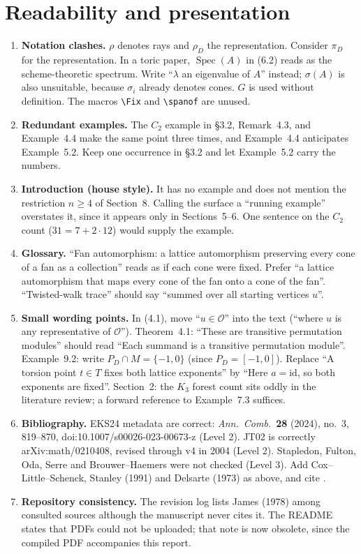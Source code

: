 \documentclass[12pt,letterpaper]{article}
\newcommand{\level}[1]{\textsf{Level #1}}
\begin{document}
\section{Readability and presentation}\label{sec:readability}
\begin{enumerate}[label=\textbf{R\arabic*.}]
\item \textbf{Notation clashes.}  $\rho$ denotes rays and $\rho_D$ the representation.  Consider $\pi_D$ for the representation.  In a toric paper, $\operatorname{Spec}(A)$ in (6.2) reads as the scheme-theoretic spectrum.  Write ``$\lambda$ an eigenvalue of $A$'' instead; $\sigma(A)$ is also unsuitable, because $\sigma_i$ already denotes cones.  $\widehat G$ is used without definition.  The macros \verb|\Fix| and \verb|\spanof| are unused.
\item \textbf{Redundant examples.}  The $C_2$ example in \S3.2, Remark~4.3, and Example~4.4 make the same point three times, and Example~4.4 anticipates Example~5.2.  Keep one occurrence in \S3.2 and let Example~5.2 carry the numbers.
\item \textbf{Introduction (house style).}  It has no example and does not mention the restriction $n\ge4$ of Section~8.  Calling the surface a ``running example'' overstates it, since it appears only in Sections~5--6.  One sentence on the $C_2$ count ($31=7+2\cdot12$) would supply the example.
\item \textbf{Glossary.}  ``Fan automorphism: a lattice automorphism preserving every cone of a fan as a collection'' reads as if each cone were fixed.  Prefer ``a lattice automorphism that maps every cone of the fan onto a cone of the fan''.  ``Twisted-walk trace'' should say ``summed over all starting vertices $u$''.
\item \textbf{Small wording points.}
In (4.1), move ``$u\in\mathcal O$'' into the text (``where $u$ is any representative of $\mathcal O$'').
Theorem~4.1: ``These are transitive permutation modules'' should read ``Each summand is a transitive permutation module''.
Example~9.2: write $P_D\cap M=\{-1,0\}$ (since $P_D=[-1,0]$).  Replace ``A torsion point $t\in T$ fixes both lattice exponents'' by ``Here $a=\mathrm{id}$, so both exponents are fixed''.
Section~2: the $K_3$ forest count sits oddly in the literature review; a forward reference to Example~7.3 suffices.
\item \textbf{Bibliography.}  EKS24 metadata are correct: \emph{Ann.\ Comb.}\ \textbf{28} (2024), no.~3, 819--870, doi:10.1007/s00026-023-00673-z (\level{2}).  JT02 is correctly arXiv:math/0210408, revised through v4 in 2004 (\level{2}).  Stapledon, Fulton, Oda, Serre and Brouwer--Haemers were not checked (\level{3}).  Add Cox--Little--Schenck, Stanley (1991) and Delsarte (1973) as above, and cite \cite{Ja78}.
\item \textbf{Repository consistency.}  The revision log lists James (1978) among consulted sources although the manuscript never cites it.  The README states that PDFs could not be uploaded; that note is now obsolete, since the compiled PDF accompanies this report.
\end{enumerate}
\end{document}
